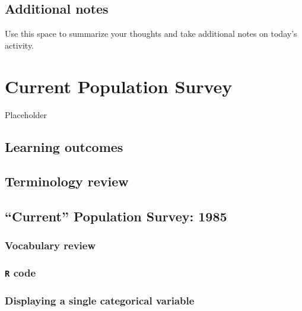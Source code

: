 \documentclass[
]{report}
\begin{document}
\hypertarget{additional-notes}{%
\section{Additional notes}\label{additional-notes}}

Use this space to summarize your thoughts and take additional notes on today's activity.

\hypertarget{current-population-survey}{%
\chapter{Current Population Survey}\label{current-population-survey}}

Placeholder

\hypertarget{learning-outcomes}{%
\section{Learning outcomes}\label{learning-outcomes}}

\hypertarget{terminology-review}{%
\section{Terminology review}\label{terminology-review}}

\hypertarget{current-population-survey-1985}{%
\section{``Current'' Population Survey: 1985}\label{current-population-survey-1985}}

\hypertarget{vocabulary-review}{%
\subsection{Vocabulary review}\label{vocabulary-review}}

\hypertarget{r-code}{%
\subsection{\texorpdfstring{\texttt{R} code}{R code}}\label{r-code}}

\hypertarget{displaying-a-single-categorical-variable}{%
\subsection{Displaying a single categorical variable}\label{displaying-a-single-categorical-variable}}
\end{document}
